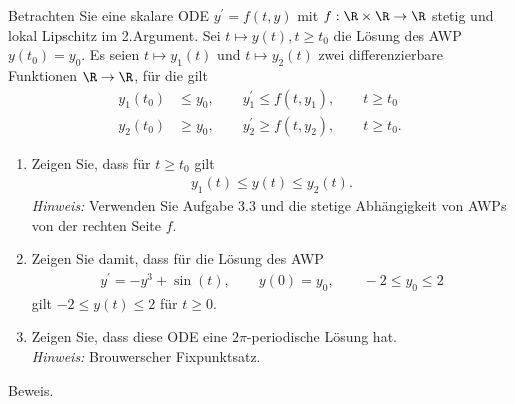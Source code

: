 \begin{exercise}
Betrachten Sie eine skalare ODE $y^{\prime} = f(t,y)$ mit $f: \R \times \R \to \R$
stetig und lokal Lipschitz im 2.Argument. Sei $t \mapsto y(t), t \geq t_0$
die Lösung des AWP $y(t_0) = y_0$. Es seien $t \mapsto y_1(t)$ und $t \mapsto y_2(t)$
zwei differenzierbare Funktionen $\R \to \R$, für die gilt
\begin{align*}
  y_1(t_0) &\leq y_0, \qquad y_1^{\prime} \leq f(t,y_1), \qquad t \geq t_0 \\
  y_2(t_0) &\geq y_0, \qquad y_2^{\prime} \geq f(t,y_2), \qquad t \geq t_0.
\end{align*}
\begin{enumerate}[label = \textbf{\alph*)}]
  \item Zeigen Sie, dass für $t \geq t_0$ gilt
  \begin{align*}
    y_1(t) \leq y(t) \leq y_2(t).
  \end{align*}
  \textit{Hinweis:} Verwenden Sie Aufgabe 3.3 und die stetige Abhängigkeit von
  AWPs von der rechten Seite $f$.
  \item Zeigen Sie damit, dass für die Lösung des AWP
  \begin{align*}
    y^{\prime} = -y^3 + \sin(t), \qquad y(0) = y_0, \qquad -2 \leq y_0 \leq 2
  \end{align*}
  gilt $-2 \leq y(t) \leq 2$ für $t \geq 0$.
  \item Zeigen Sie, dass diese ODE eine $2\pi$-periodische Lösung hat. \\
  \textit{Hinweis:} Brouwerscher Fixpunktsatz.
\end{enumerate}
\end{exercise}
\begin{solution}
Beweis.
\end{solution}
